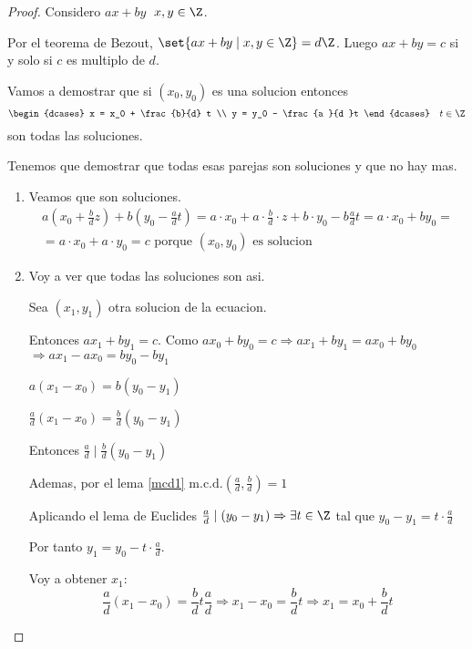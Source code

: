 \begin{proof}
	Considero \(ax + by \) \(\; x,y \in \Z \).

	Por el teorema de Bezout, \(\set{ax + by \mid x,y \in \Z }= d\Z\). Luego \(ax + by = c \) si y solo si \(c \) es multiplo de \(d \).

	Vamos a demostrar que si \((x_0,y_0 )\) es una solucion entonces
	\[
		\begin{dcases}
			x = x_0 + \frac{b}{d} t \\
			y = y_0 - \frac{a }{d }t
		\end{dcases} \quad t \in \Z
	\]
	son todas las soluciones.

	Tenemos que demostrar que todas esas parejas son soluciones y que no hay mas.

	\begin{enumerate}
		\item Veamos que son soluciones.
		      \begin{multline*}
			      a(x_0 + \frac{b}{d}z ) + b (y_0 - \frac{a}{d}t) = a \cdot x_0 + a \cdot \frac{b}{d} \cdot z + b \cdot y_0 - b \frac{a }{d }t = a \cdot x_0 + by_0 = \\
			      = a \cdot x_0 + a \cdot y_0 = c \text{ porque } (x_0, y_0 ) \text{ es solucion}
		      \end{multline*}
		\item Voy a ver que todas las soluciones son asi.

		      Sea \((x_1,y_1 )\) otra solucion de la ecuacion.

		      Entonces \(ax_1 + by_1 = c \). Como \(ax_0 + by_0 = c \Rightarrow ax_1 + by_1 = ax_0 + by_0\) \(\Rightarrow ax_1 - ax_0 = by_0 - by_1 \)

		      \(a(x_1 - x_0) = b(y_0 - y_1 )\)

		      \(\frac{a}{d}(x_1 - x_0) = \frac{b}{d} (y_0 - y_1)\)

		      Entonces \(\frac{a}{d} \mid \frac{b}{d}(y_0 - y_1)\)

		      Ademas, por el lema \ref{mcd1} \(\mathrm{m.c.d.}(\frac{a}{d}, \frac{b}{d}) = 1 \)

		      Aplicando el lema de Euclides \(\frac{a}{d} \mid (y_0 - y_1)\Rightarrow \exists t \in \Z\) tal que \(y_0 - y_1 = t \cdot \frac{a}{d }\)

		      Por tanto \(y_1 = y_0 - t \cdot \frac{a}{d }\).

		      Voy a obtener \(x_1 \):
		      \[
			      \frac{a}{d} (x_1 - x_0) = \frac{b}{d} t \frac{a}{d} \Rightarrow x_1 - x_0 = \frac{b}{d} t \Rightarrow x_1 = x_0 + \frac{b}{d} t
		      \]
	\end{enumerate}
\end{proof}

